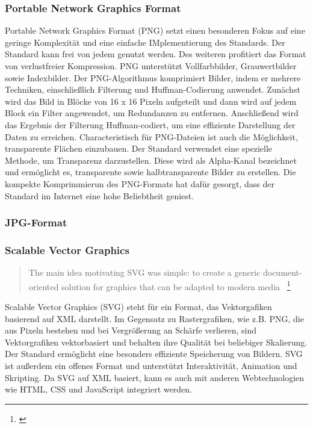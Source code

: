 \subsubsection{Portable Network Graphics Format}
Portable Network Graphics Format (PNG) setzt einen besonderen Fokus auf eine geringe Komplexität und eine einfache IMplementierung des Standards. 
Der Standard kann frei von jedem genutzt werden.
Des weiteren profitiert das Format von verlustfreier Kompression. 
PNG unterstützt Vollfarbbilder, Grauwertbilder sowie Indexbilder. 
Der PNG-Algorithmus komprimiert Bilder, indem er mehrere Techniken, einschließlich Filterung und Huffman-Codierung anwendet. Zunächst wird das Bild in Blöcke von 16 x 16 Pixeln aufgeteilt und dann wird auf jedem Block ein Filter angewendet, um Redundanzen zu entfernen. Anschließend wird das Ergebnis der Filterung Huffman-codiert, um eine effiziente Darstellung der Daten zu erreichen.
Characteristisch für PNG-Dateien ist auch die Möglichkeit, transparente Flächen einzubauen. 
Der Standard verwendet eine spezielle Methode, um Transparenz darzustellen. 
Diese wird als Alpha-Kanal bezeichnet und ermöglicht es, transparente sowie halbtransparente Bilder zu erstellen.
Die kompekte Komprimmierun des PNG-Formats hat dafür gesorgt, dass der Standard im Internet eine hohe Beliebtheit geniest. 

\subsubsection{JPG-Format}


\subsubsection{Scalable Vector Graphics}
\begin{quote}
    The main idea motivating SVG was simple: to create a generic document-oriented solution  for graphics that can be adapted to modern media
    \grqq{}~\footnote{\cite{book:729077}}
\end{quote}

Scalable Vector Graphics (SVG) steht für ein Format, das Vektorgafiken basierend auf XML darstellt.
Im Gegensatz zu Rastergrafiken, wie z.B. PNG, die aus Pixeln bestehen und bei Vergrößerung an Schärfe verlieren, sind Vektorgrafiken vektorbasiert und behalten ihre Qualität bei beliebiger Skalierung. 
Der Standard ermöglicht eine besonders effiziente Speicherung von Bildern.
SVG ist außerdem ein offenes Format und unterstützt Interaktivität, Animation und Skripting. 
Da SVG auf XML basiert, kann es auch mit anderen Webtechnologien wie HTML, CSS und JavaScript integriert werden. 

